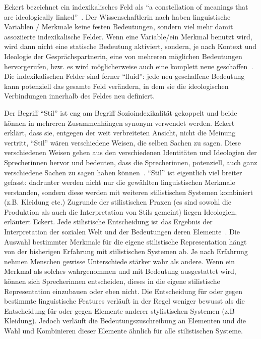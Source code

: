 Eckert bezeichnet ein indexikalisches Feld als ``a constellation of meanings that are ideologically linked''~\cite{Eckert08}. %
Der Wissenschaftlerin nach haben linguistische Variablen / Merkmale keine festen Bedeutungen, sondern viel mehr damit assoziierte indexikalische Felder.
Wenn eine Variable/ein Merkmal benutzt wird, wird dann nicht eine statische Bedeutung aktiviert, sondern, je nach Kontext und Ideologie der Gesprächspartnerin, eine von mehreren möglichen Bedeutungen hervorgerufen, bzw. es wird möglicherweise auch eine komplett neue geschaffen~\cite{Eckert08}. %
Die indexikalischen Felder sind ferner ``fluid'': jede neu geschaffene Bedeutung kann potenziell das gesamte Feld verändern, in dem sie die ideologischen Verbindungen innerhalb des Feldes neu definiert. %

Der Begriff ``Stil'' ist eng am Begriff Sozioindexikalität gekoppelt und beide können in mehreren Zusammenhängen synonym verwendet werden.
Eckert erklärt, dass sie, entgegen der weit verbreiteten Ansicht, nicht die Meinung vertritt, ``Stil'' wären verschiedene Weisen, die selben Sachen zu sagen.
Diese verschiedenen Weisen gehen aus den verschiedenen Identitäten und Ideologien der Sprecherinnen hervor und bedeuten, dass die Sprecherinnen, potenziell, auch ganz verschiedene Sachen zu sagen haben können~\cite{Eckert08}. %
``Stil'' ist eigentlich viel breiter gefasst: dadrunter werden nicht nur die gewählten linguistischen Merkmale verstanden, sondern diese werden mit weiteren stilistischen Systemen kombiniert (z.B. Kleidung etc.)
Zugrunde der stilistischen Praxen (es sind sowohl die Produktion als auch die Interpretation von Stils gemeint) liegen Ideologien, erläutert Eckert.
Jede stilistische Entscheidung ist das Ergebnis der Interpretation der sozialen Welt und der Bedeutungen deren Elemente~\cite{Eckert08}. %
Die Auswahl bestimmter Merkmale für die eigene stilistische Representation hängt von der bisherigen Erfahrung mit stilistischen Systemen ab.
Je nach Erfahrung nehmen Menschen gewisse Unterschiede stärker wahr als andere.
Wenn ein Merkmal als solches wahrgenommen und mit Bedeutung ausgestattet wird, können sich Sprecherinnen entscheiden, dieses in die eigene stilistische Representation einzubauen oder eben nicht.
Die Entscheidung für oder gegen bestimmte linguistische Features verläuft in der Regel weniger bewusst als die Entscheidung für oder gegen Elemente anderer stylistischen Systemen (z.B Kleidung).
Jedoch verläuft die Bedeutungszuschreibung an Elementen und die Wahl und Kombinieren dieser Elemente ähnlich für alle stilistischen Systeme.

